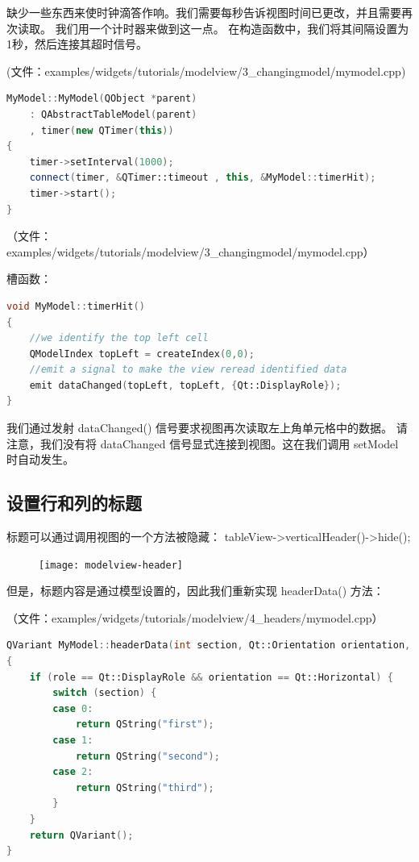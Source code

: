 缺少一些东西来使时钟滴答作响。我们需要每秒告诉视图时间已更改，并且需要再次读取。
我们用一个计时器来做到这一点。
在构造函数中，我们将其间隔设置为1秒，然后连接其超时信号。

(文件：examples/widgets/tutorials/modelview/3\_changingmodel/mymodel.cpp)

\begin{lstlisting}[language=C++]
MyModel::MyModel(QObject *parent)
    : QAbstractTableModel(parent)
    , timer(new QTimer(this))
{
    timer->setInterval(1000);
    connect(timer, &QTimer::timeout , this, &MyModel::timerHit);
    timer->start();
}
\end{lstlisting}

（文件：examples/widgets/tutorials/modelview/3\_changingmodel/mymodel.cpp）

槽函数：

\begin{lstlisting}[language=C++]
void MyModel::timerHit()
{
    //we identify the top left cell
    QModelIndex topLeft = createIndex(0,0);
    //emit a signal to make the view reread identified data
    emit dataChanged(topLeft, topLeft, {Qt::DisplayRole});
}
\end{lstlisting}

我们通过发射 dataChanged() 信号要求视图再次读取左上角单元格中的数据。
请注意，我们没有将 dataChanged 信号显式连接到视图。这在我们调用 setModel 时自动发生。

\subsection{设置行和列的标题} 

标题可以通过调用视图的一个方法被隐藏： tableView->verticalHeader()->hide();

\begin{figure}[hbt!]  
\texttt{[image: modelview-header]}
\end{figure}

但是，标题内容是通过模型设置的，因此我们重新实现 headerData() 方法：

（文件：examples/widgets/tutorials/modelview/4\_headers/mymodel.cpp）

\begin{lstlisting}[language=C++]
QVariant MyModel::headerData(int section, Qt::Orientation orientation, int role) const
{
    if (role == Qt::DisplayRole && orientation == Qt::Horizontal) {
        switch (section) {
        case 0:
            return QString("first");
        case 1:
            return QString("second");
        case 2:
            return QString("third");
        }
    }
    return QVariant();
}
\end{lstlisting}

